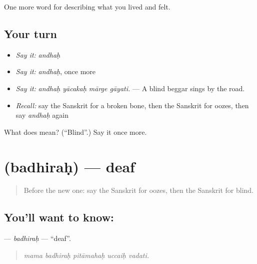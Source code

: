 \begin{grammarlens}[title={What you've built}]
One more word for describing what you lived and felt.
\end{grammarlens}

\subsection*{Your turn}
\begin{itemize}
\raggedright
  \item \emph{Say it:} \emph{andhaḥ}
  \item \emph{Say it:} \emph{andhaḥ}, once more
  \item \emph{Say it:} \emph{andhaḥ yācakaḥ mārge gāyati.} — A blind beggar sings by the road.
  \item \emph{Recall:} say the Sanskrit for a broken bone, then the Sanskrit for oozes, then say \emph{andhaḥ} again
\end{itemize}

\begin{tcolorbox}[breakable,colback=teal!4,colframe=teal!35!black,title={Before you move on}]
What does  mean? (\textquotedblleft{}Blind\textquotedblright{}.) Say it once more.
\end{tcolorbox}
\section[\texorpdfstring{\sk{बधिरः} (badhiraḥ)}{बधिरः (badhiraḥ)}]{ (badhiraḥ) — deaf}

\label{lesson:SA-C481-badhirah}



\begin{quote}
Before the new one: say the Sanskrit for oozes, then the Sanskrit for blind.
\end{quote}

\subsection*{You'll want to know: }
\textbf{} — \emph{badhiraḥ} — \textquotedblleft{}deaf\textquotedblright{}.

\begin{quote}
    
\end{quote}

\begin{quote}
\emph{mama badhiraḥ pitāmahaḥ uccaiḥ vadati.}
\end{quote}

